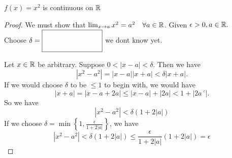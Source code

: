 \pagebreak

\begin{thm}
  $f(x)=x^{2}$ is continuous on $\mathbb{R}$
\end{thm}
\begin{proof}
  We must show that $\lim_{x \to a}x^{2} = a^{2} \quad \forall a\in \mathbb{R}$.
  Given $\epsilon >0, a\in \mathbb{R}.$ \\ Choose
  $\delta = \boxed{\color{white}\min \left\{1, \frac{\epsilon}{1+2|a|}\right\}}$
  we dont know yet.

  Let $x\in \mathbb{R}$ be arbitrary. Suppose $0<|x-a|<\delta$. Then
  we have
  \begin{dmath}
    |x^2-a^2|=|x-a||x+a|<\delta|x+a|.
  \end{dmath}
  If we would choose $\delta$ to be $\leq 1$ to begin with, we would have
  \begin{dmath}
    |x+a| = |x-a+2a| \leq |x-a| + |2a| < 1 + |2a´|.
  \end{dmath}
  So we have
  \begin{equation}
    |x^{2}-a^{2}| < \delta (1+2|a|)
  \end{equation}
  If we choose $\delta = \boxed{\min \left\{1, \frac{\epsilon}{1+2|a|}\right\}}$,
  we have
  \begin{dmath}
    |x^2-a^2| < \delta (1+2|a|) \leq \frac{\epsilon}{1+2|a|} (1+2|a|) = \epsilon
  \end{dmath}
\end{proof}